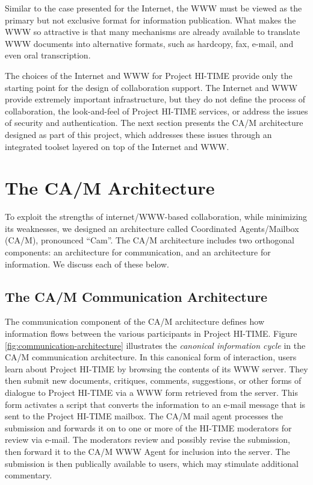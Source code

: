 \begin{enumerate}
  Similar to the case presented for the Internet, the WWW must be viewed
  as the primary but not exclusive format for information publication.
  What makes the WWW so attractive is that many mechanisms are already
  available to translate WWW documents into alternative formats, such as
  hardcopy, fax, e-mail, and even oral transcription.

\end{enumerate}

The choices of the Internet and WWW for Project HI-TIME provide only the
starting point for the design of collaboration support.  The Internet and
WWW provide extremely important infrastructure, but they do not define the
process of collaboration, the look-and-feel of Project HI-TIME services, or
address the issues of security and authentication.  The next section
presents the CA/M architecture designed as part of this project, which
addresses these issues through an integrated toolset layered on top of the
Internet and WWW.

\section{The CA/M Architecture}

To exploit the strengths of internet/WWW-based collaboration, while 
minimizing its weaknesses, we designed an architecture called
Coordinated Agents/Mailbox (CA/M), pronounced ``Cam''.  The CA/M 
architecture includes two orthogonal components: an architecture
for communication, and an architecture for information.  We discuss
each of these below.

\subsection{The CA/M Communication Architecture}

The communication component of the CA/M architecture defines how
information flows between the various participants in Project HI-TIME.
Figure \ref{fig:communication-architecture} illustrates the {\em canonical
information cycle\/} in the CA/M communication architecture. In this
canonical form of interaction, users learn about Project HI-TIME by
browsing the contents of its WWW server.  They then submit new documents,
critiques, comments, suggestions, or other forms of dialogue to Project
HI-TIME via a WWW form retrieved from the server.
This form activates a script that
converts the information to an e-mail message that is sent to the
Project HI-TIME mailbox.    The CA/M mail agent processes
the submission and forwards it on to 
one or more of the HI-TIME moderators for review via e-mail.  The
moderators review and possibly revise the submission, then forward it 
to the CA/M WWW Agent for inclusion into the server.  The submission is then
publically available to users, which may stimulate additional commentary.


